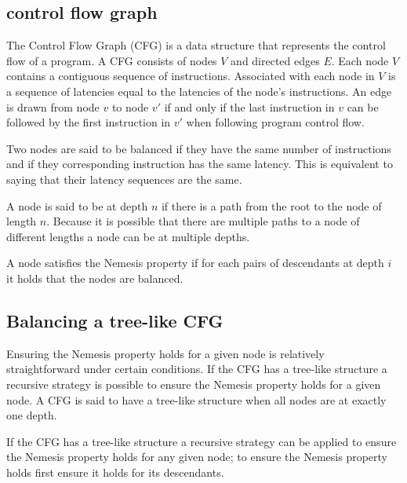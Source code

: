 \documentclass{article}
\begin{document}
\subsection{control flow graph}
The Control Flow Graph (CFG) is a data structure that represents the control flow of a program. A CFG consists of nodes $V$ and directed edges $E$. Each node $V$ contains a contiguous sequence of instructions. Associated with each node 
in $V$ is a sequence of latencies equal to the latencies of the node's instructions. An edge is drawn from node $v$ to node $v'$ if and only if the last instruction in $v$ can be followed by the first instruction in $v'$ when following 
program control flow. 

Two nodes are said to be balanced if they have the same number of instructions and if they corresponding instruction has the same latency. This is equivalent to saying that their latency sequences are the same. 

A node is said to be at depth $n$ if there is a path from the root to the node of length $n$. Because it is possible that there are multiple paths to a node of different lengths a node can be at multiple depths. 

A node satisfies the Nemesis property if for each pairs of descendants at depth $i$ it holds that the nodes are balanced.  

\subsection{Balancing a tree-like CFG}
Ensuring the Nemesis property holds for a given node is relatively straightforward under certain conditions. If the CFG has a tree-like structure a recursive 
strategy is possible to ensure the Nemesis property holds for a given node. A CFG is said to have a tree-like structure when all nodes are at exactly one depth. 

If the CFG has a tree-like structure a recursive strategy can be applied to ensure the Nemesis property holds for any given node; to ensure the Nemesis property holds
first ensure it holds for its descendants. 
\end{document}

